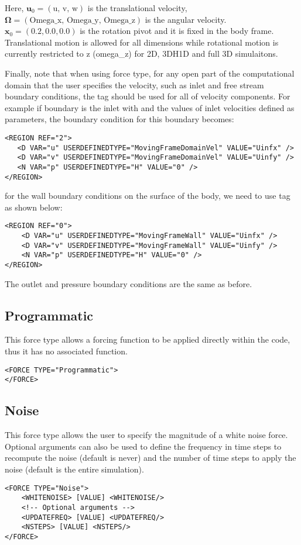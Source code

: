 Here, $\mathbf{u}_0 = (\text{u, v, w})$ is the translational velocity, $\mathbf{\Omega}=(\text{Omega\_x, Omega\_y, Omega\_z})$ is the angular velocity.
$\mathbf{x}_0=(0.2, 0.0, 0.0)$ is the rotation pivot and it is fixed in the body frame.
Translational motion is allowed for all dimensions while rotational motion is currently restricted to z (omega\_z) for 2D, 3DH1D and full 3D simulaitons.

Finally, note that when using  force type, for any open part of the computational domain that the user specifies the velocity, such as inlet and free stream boundary conditions, the  tag should be used for all of velocity components. For example if boundary  is the inlet with  and  the values of inlet velocities defined as parameters, the boundary condition for this boundary becomes:

\begin{lstlisting}[style=XMLStyle]
<REGION REF="2"> 
   <D VAR="u" USERDEFINEDTYPE="MovingFrameDomainVel" VALUE="Uinfx" />
   <D VAR="v" USERDEFINEDTYPE="MovingFrameDomainVel" VALUE="Uinfy" />
   <N VAR="p" USERDEFINEDTYPE="H" VALUE="0" />  
</REGION>
\end{lstlisting}

for the wall boundary conditions on the surface of the body, we need to use  tag as shown below:

\begin{lstlisting}[style=XMLStyle]
<REGION REF="0"> 
    <D VAR="u" USERDEFINEDTYPE="MovingFrameWall" VALUE="Uinfx" />
    <D VAR="v" USERDEFINEDTYPE="MovingFrameWall" VALUE="Uinfy" />
    <N VAR="p" USERDEFINEDTYPE="H" VALUE="0" />  
</REGION>
\end{lstlisting}

The outlet and pressure boundary conditions are the same as before.


\subsection{Programmatic}
This force type allows a forcing function to be applied directly within the code, thus it has no associated function. 

\begin{lstlisting}[style=XMLStyle] 
<FORCE TYPE="Programmatic">
</FORCE>
\end{lstlisting}


\subsection{Noise}
This force type allows the user to specify the magnitude of a white noise force. 
Optional arguments can also be used to define the frequency in time steps to recompute the noise (default is never)
 and the number of time steps to apply the noise (default is the entire simulation).  

\begin{lstlisting}[style=XMLStyle] 
<FORCE TYPE="Noise">
    <WHITENOISE> [VALUE] <WHITENOISE/>
    <!-- Optional arguments -->
    <UPDATEFREQ> [VALUE] <UPDATEFREQ/>
    <NSTEPS> [VALUE] <NSTEPS/>
</FORCE>
\end{lstlisting}
